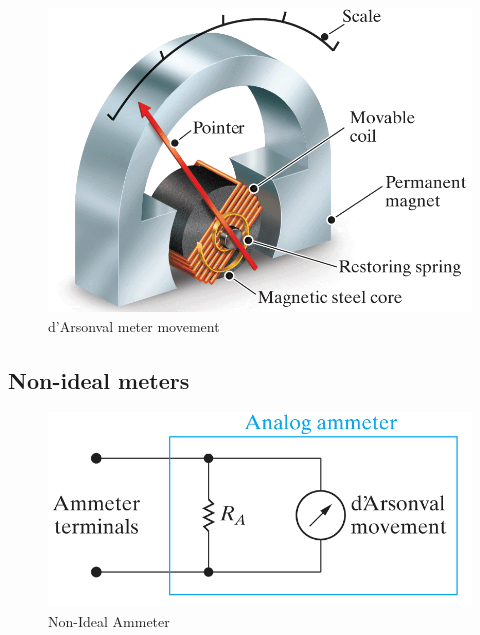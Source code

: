 \documentclass[14pt]{memoir}
\begin{document}
\begin{figure}[H]
\begin{center}
\includegraphics[scale=0.50]{fig/fig03_25.png}
\caption{d'Arsonval meter movement}
\label{fig:fig03_25}
\end{center}
\end{figure}

\subsection{Non-ideal meters}

\begin{figure}[H]
\begin{center}
\includegraphics[scale=0.50]{fig/fig03_26.png}
\caption{Non-Ideal Ammeter}
\label{fig:fig03_26}
\end{center}
\end{figure}
\end{document}
